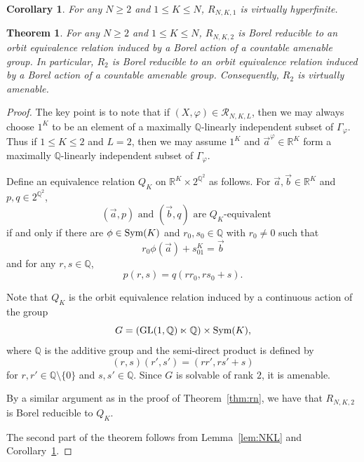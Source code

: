 \documentclass[10pt,a4paper]{amsart}
\newtheorem{theorem}{Theorem}
\newtheorem{corollary}{Corollary}
\begin{document}
\begin{corollary}\label{cor:L1} For any $N\geq 2$ and $1\leq K\leq N$, $R_{N,K,1}$ is virtually hyperfinite.
\end{corollary}

\begin{theorem} For any $N\geq 2$ and $1\leq K\leq N$, $R_{N, K, 2}$ is Borel reducible to an orbit equivalence relation induced by a Borel action of a countable amenable group. In particular, $R_2$ is Borel reducible to an orbit equivalence relation induced by a Borel action of a countable amenable group. Consequently, $R_2$ is virtually amenable. 
\end{theorem}

\begin{proof} The key point is to note that if $(X, \varphi)\in \mathcal{R}_{N,K, L}$, then we may always choose $1^K$ to be an element of a maximally $\mathbb{Q}$-linearly independent subset of $\Gamma_\varphi$. Thus if $1\leq K\leq 2$ and $L=2$, then we may assume $1^K$ and $\vec{a}^\varphi\in \mathbb{R}^K$ form a maximally $\mathbb{Q}$-linearly independent subset of $\Gamma_\varphi$. 

Define an equivalence relation $Q_K$ on $\mathbb{R}^K\times 2^{\mathbb{Q}^2}$ as follows. For $\vec{a}, \vec{b}\in \mathbb{R}^K$ and $p,q\in 2^{\mathbb{Q}^2}$, 
$$ \mbox{ $(\vec{a}, p)$ and $(\vec{b}, q)$ are $Q_K$-equivalent} $$
if and only if there are $\phi\in\mbox{\rm Sym}(K)$ and $r_0, s_0\in \mathbb{Q}$ with $r_0\neq 0$ such that
$$ r_0\phi(\vec{a})+s_01^K=\vec{b} $$
and for any $r, s\in \mathbb{Q}$,
$$ p(r, s)=q(rr_0, rs_0+s). $$

Note that $Q_K$ is the orbit equivalence relation induced by a continuous action of the group
$$ G=(\mbox{\rm GL}(1, \mathbb{Q})\ltimes \mathbb{Q})\times \mbox{\rm Sym}(K), $$
where $\mathbb{Q}$ is the additive group and the semi-direct product is defined by
$$ (r, s)(r',s')=(rr', rs'+s) $$
for $r,r'\in\mathbb{Q}\setminus\{0\}$ and $s, s'\in\mathbb{Q}$. Since $G$ is solvable of rank $2$, it is amenable. 

By a similar argument as in the proof of Theorem~\ref{thm:rn}, we have that $R_{N, K, 2}$ is Borel reducible to $Q_K$. 

The second part of the theorem follows from Lemma~\ref{lem:NKL} and Corollary~\ref{cor:L1}.
\end{proof}
\end{document}
